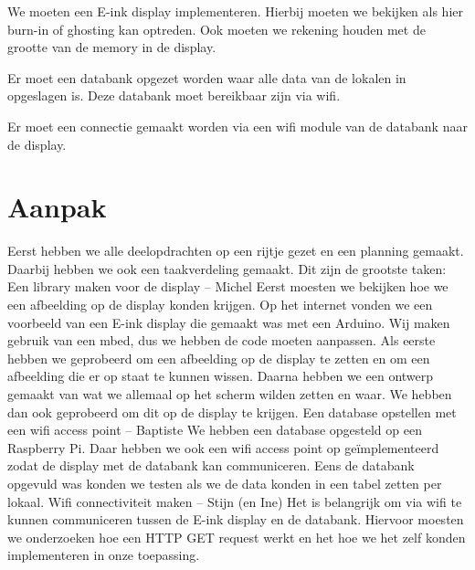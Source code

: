 \documentclass[a4paper,kul]{kulakarticle} %
\begin{document}
We moeten een E-ink display implementeren. Hierbij moeten we bekijken als hier burn-in of ghosting kan optreden. Ook moeten we rekening houden met de grootte van de memory in de display. 

Er moet een databank opgezet worden waar alle data van de lokalen in opgeslagen is. Deze databank moet bereikbaar zijn via wifi.

Er moet een connectie gemaakt worden via een wifi module van de databank naar de display.

\newpage

\section{Aanpak}

Eerst hebben we alle deelopdrachten op een rijtje gezet en een planning gemaakt. Daarbij hebben we ook een taakverdeling gemaakt. 
\newline
\newline
Dit zijn de grootste taken:
\newline
\newline
Een library maken voor de display – Michel
\newline
Eerst moesten we bekijken hoe we een afbeelding op de display konden krijgen. Op het internet vonden we een voorbeeld van een E-ink display die gemaakt was met een Arduino. Wij maken gebruik van een mbed, dus we hebben de code moeten aanpassen. 
Als eerste hebben we geprobeerd om een afbeelding op de display te zetten en om een afbeelding die er op staat te kunnen wissen.
Daarna hebben we een ontwerp gemaakt van wat we allemaal op het scherm wilden zetten en waar. We hebben dan ook geprobeerd om dit op de display te krijgen.
\newline
\newline
Een database opstellen met een wifi access point – Baptiste
\newline
We hebben een database opgesteld op een Raspberry Pi. Daar hebben we ook een wifi access point op geïmplementeerd zodat de display met de databank kan communiceren.
Eens de databank opgevuld was konden we testen als we de data konden in een tabel zetten per lokaal.
\newline
\newline
Wifi connectiviteit maken – Stijn (en Ine)
\newline
Het is belangrijk om via wifi te kunnen communiceren tussen de E-ink display en de databank. Hiervoor moesten we onderzoeken hoe een HTTP GET request werkt en het hoe we het zelf konden implementeren in onze toepassing.
\end{document}
